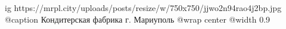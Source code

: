  
 
 
 
 

\ifcmt
  ig https://mrpl.city/uploads/posts/resize/w/750x750/jjwo2n94rao4j2bp.jpg
	@caption Кондитерская фабрика г. Мариуполь
  @wrap center
  @width 0.9
\fi
